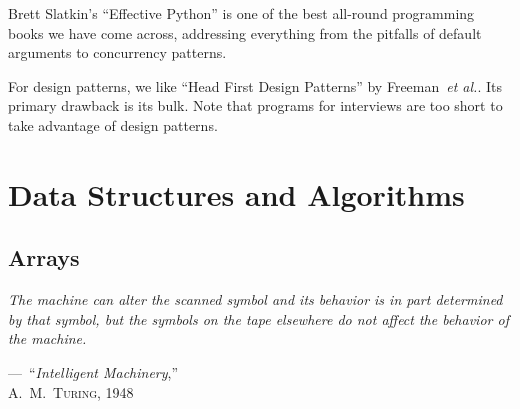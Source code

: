 \documentclass[10pt,openany,twoside,letterpaper,extrafontsizes]{memoir}
\newif\ifscaleforSixNine
\newcommand{\epioffset}{0mm}
\newcommand{\sixnineEpi}[3]{
\ifscaleforSixNine
\renewcommand{\blueboxheight}{#1}
\setlength{\epigraphwidth}{#2\textwidth}
\renewcommand{\epioffset}{#3}
\fi
}
\newcommand\myepigraph[3]{%
\vspace{#3}%
\epigraph{\textit{#1}}{#2}%
}
\newcommand{\blueboxheight}{10}
\begin{document}
\begin{Spacing}{\gettingReadySpacing}
Brett Slatkin's ``Effective Python'' is one of the best all-round programming books we have come across, addressing everything from the pitfalls of default arguments to concurrency patterns.

For design patterns, we like ``Head First Design Patterns'' by Freeman~{\em et al.}.
Its primary drawback is its bulk.  Note that programs for interviews are too short to take advantage of design patterns.
\fi%

\end{Spacing}


\part{\partpadding Data Structures and Algorithms}

\renewcommand{\chaptermark}[1]{ }

\renewcommand{\blueboxheight}{12}
\setlength{\epigraphwidth}{0.43\textwidth}
\renewcommand{\epioffset}{-38mm}
\sixnineEpi{10}{0.5}{-34.5mm}
\chapter{Arrays}
\label{array}
\myepigraph{%
The machine can alter the scanned symbol and its behavior is in part determined by that symbol, but the symbols on the tape elsewhere do not affect the behavior of the machine.
}{
---~``\textit{Intelligent Machinery},''\\ \textsc{A.~M.~Turing}, 1948
}{\epioffset}

\end{document}

